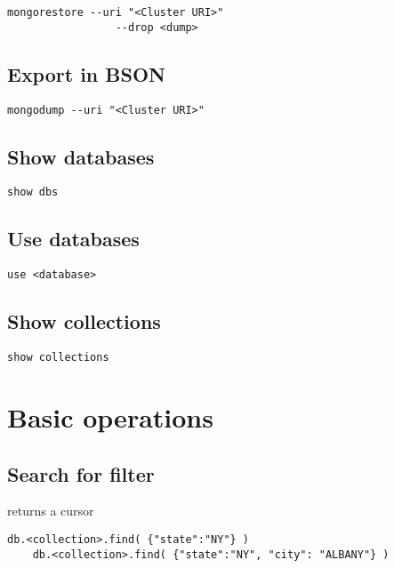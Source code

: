 \documentclass[a4paper]{article}
\begin{document}
\begin{lstlisting}[style=js]
    mongorestore --uri "<Cluster URI>"
                 --drop <dump>
\end{lstlisting}

\subsection{Export in BSON}

\begin{lstlisting}[style=js]
    mongodump --uri "<Cluster URI>"
\end{lstlisting}

\subsection{Show databases}

\begin{lstlisting}[style=js]
    show dbs
\end{lstlisting}

\subsection{Use databases}

\begin{lstlisting}[style=js]
    use <database>
\end{lstlisting}

\subsection{Show collections}

\begin{lstlisting}[style=js]
    show collections
\end{lstlisting}

\pagebreak

\section{Basic operations}

\subsection{Search for filter}

returns a cursor

\begin{lstlisting}[style=js]
    db.<collection>.find( {"state":"NY"} )
    db.<collection>.find( {"state":"NY", "city": "ALBANY"} )
\end{lstlisting}
\end{document}
